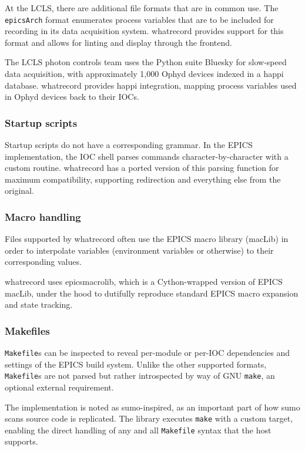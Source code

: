 \documentclass[letter,
               keeplastbox,   %
               ]{jacow}
\begin{document}
At the LCLS, there are additional file formats that are in common use.
The \verb_epicsArch_ format enumerates process variables that are to be
included for recording in its data acquisition system.  whatrecord provides
support for this format and allows for linting and display through the
frontend.

The LCLS photon controls team uses the Python suite Bluesky\cite{bluesky} for
slow-speed data acquisition, with approximately 1,000 Ophyd devices indexed in
a happi\cite{happi} database.  whatrecord provides happi integration, mapping
process variables used in Ophyd devices back to their IOCs.

\subsubsection{Startup scripts}

Startup scripts do not have a corresponding grammar. In the EPICS
implementation, the IOC shell parses commands character-by-character with a
custom routine.  whatrecord has a ported version of this parsing function
for maximum compatibility, supporting redirection and everything else from the
original.

\subsubsection{Macro handling}

Files supported by whatrecord often use the EPICS macro library (macLib)
in order to interpolate variables (environment variables or otherwise) to their
corresponding values.

whatrecord uses epicsmacrolib\cite{epicsmacrolib}, which is a Cython-wrapped
version of EPICS macLib, under the hood to dutifully reproduce standard EPICS
macro expansion and state tracking.

\subsubsection{Makefiles}

\verb_Makefile_s can be inspected to reveal per-module or per-IOC dependencies
and settings of the EPICS build system. Unlike the other supported formats, 
\verb_Makefile_s are not parsed but rather introspected by way of GNU
\verb_make_, an optional external requirement.

The implementation is noted as sumo\cite{sumo}-inspired, as an important part
of how sumo scans source code is replicated. The library executes \verb_make_
with a custom target, enabling the direct handling of any and all
\verb_Makefile_ syntax that the host supports.
\end{document}
